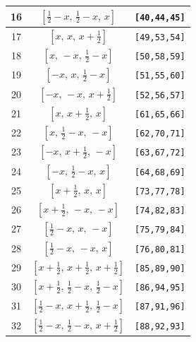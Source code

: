 \documentclass[fleqn,8pt]{jsarticle}
\begin{document}
\begin{longtable}{ccc}
16 & $\left[ \frac{1}{2} - x,\, \frac{1}{2} - x,\, x \right]$ & {\tt [40,44,45]} \\ \hline
17 & $\left[ x,\, x,\, x + \frac{1}{2} \right]$ & {\tt [49,53,54]} \\ \hline
18 & $\left[ x,\, - x,\, \frac{1}{2} - x \right]$ & {\tt [50,58,59]} \\ \hline
19 & $\left[ - x,\, x,\, \frac{1}{2} - x \right]$ & {\tt [51,55,60]} \\ \hline
20 & $\left[ - x,\, - x,\, x + \frac{1}{2} \right]$ & {\tt [52,56,57]} \\ \hline
21 & $\left[ x,\, x + \frac{1}{2},\, x \right]$ & {\tt [61,65,66]} \\ \hline
22 & $\left[ x,\, \frac{1}{2} - x,\, - x \right]$ & {\tt [62,70,71]} \\ \hline
23 & $\left[ - x,\, x + \frac{1}{2},\, - x \right]$ & {\tt [63,67,72]} \\ \hline
24 & $\left[ - x,\, \frac{1}{2} - x,\, x \right]$ & {\tt [64,68,69]} \\ \hline
25 & $\left[ x + \frac{1}{2},\, x,\, x \right]$ & {\tt [73,77,78]} \\ \hline
26 & $\left[ x + \frac{1}{2},\, - x,\, - x \right]$ & {\tt [74,82,83]} \\ \hline
27 & $\left[ \frac{1}{2} - x,\, x,\, - x \right]$ & {\tt [75,79,84]} \\ \hline
28 & $\left[ \frac{1}{2} - x,\, - x,\, x \right]$ & {\tt [76,80,81]} \\ \hline
29 & $\left[ x + \frac{1}{2},\, x + \frac{1}{2},\, x + \frac{1}{2} \right]$ & {\tt [85,89,90]} \\ \hline
30 & $\left[ x + \frac{1}{2},\, \frac{1}{2} - x,\, \frac{1}{2} - x \right]$ & {\tt [86,94,95]} \\ \hline
31 & $\left[ \frac{1}{2} - x,\, x + \frac{1}{2},\, \frac{1}{2} - x \right]$ & {\tt [87,91,96]} \\ \hline
32 & $\left[ \frac{1}{2} - x,\, \frac{1}{2} - x,\, x + \frac{1}{2} \right]$ & {\tt [88,92,93]} \\
\end{longtable}
\renewcommand{\arraystretch}{1.2}
\end{document}
